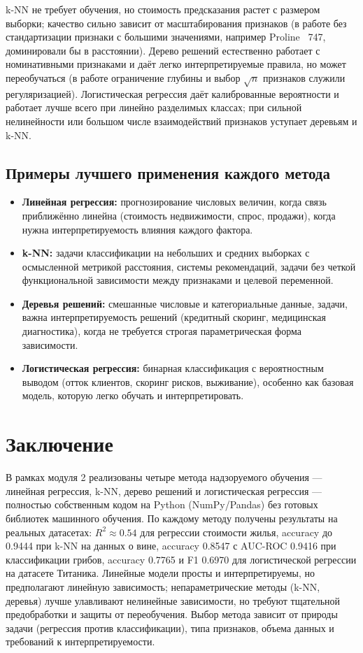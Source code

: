\documentclass[12pt,a4paper]{article}
\begin{document}
k-NN не требует обучения, но стоимость предсказания растет с размером выборки; качество сильно зависит от масштабирования признаков (в работе без стандартизации признаки с большими значениями, например Proline ~747, доминировали бы в расстоянии). Дерево решений естественно работает с номинативными признаками и даёт легко интерпретируемые правила, но может переобучаться (в работе ограничение глубины и выбор $\sqrt{n}$ признаков служили регуляризацией). Логистическая регрессия даёт калиброванные вероятности и работает лучше всего при линейно разделимых классах; при сильной нелинейности или большом числе взаимодействий признаков уступает деревьям и k-NN.

\subsection{Примеры лучшего применения каждого метода}
\begin{itemize}
\item \textbf{Линейная регрессия:} прогнозирование числовых величин, когда связь приближённо линейна (стоимость недвижимости, спрос, продажи), когда нужна интерпретируемость влияния каждого фактора.
\item \textbf{k-NN:} задачи классификации на небольших и средних выборках с осмысленной метрикой расстояния, системы рекомендаций, задачи без четкой функциональной зависимости между признаками и целевой переменной.
\item \textbf{Деревья решений:} смешанные числовые и категориальные данные, задачи, важна интерпретируемость решений (кредитный скоринг, медицинская диагностика), когда не требуется строгая параметрическая форма зависимости.
\item \textbf{Логистическая регрессия:} бинарная классификация с вероятностным выводом (отток клиентов, скоринг рисков, выживание), особенно как базовая модель, которую легко обучать и интерпретировать.
\end{itemize}

\section{Заключение}
В рамках модуля 2 реализованы четыре метода надзоруемого обучения --- линейная регрессия, k-NN, дерево решений и логистическая регрессия --- полностью собственным кодом на Python (NumPy/Pandas) без готовых библиотек машинного обучения. По каждому методу получены результаты на реальных датасетах: $R^2 \approx 0.54$ для регрессии стоимости жилья, accuracy до 0.9444 при k-NN на данных о вине, accuracy 0.8547 с AUC-ROC 0.9416 при классификации грибов, accuracy 0.7765 и F1 0.6970 для логистической регрессии на датасете Титаника. Линейные модели просты и интерпретируемы, но предполагают линейную зависимость; непараметрические методы (k-NN, деревья) лучше улавливают нелинейные зависимости, но требуют тщательной предобработки и защиты от переобучения. Выбор метода зависит от природы задачи (регрессия против классификации), типа признаков, объема данных и требований к интерпретируемости.
\end{document}

